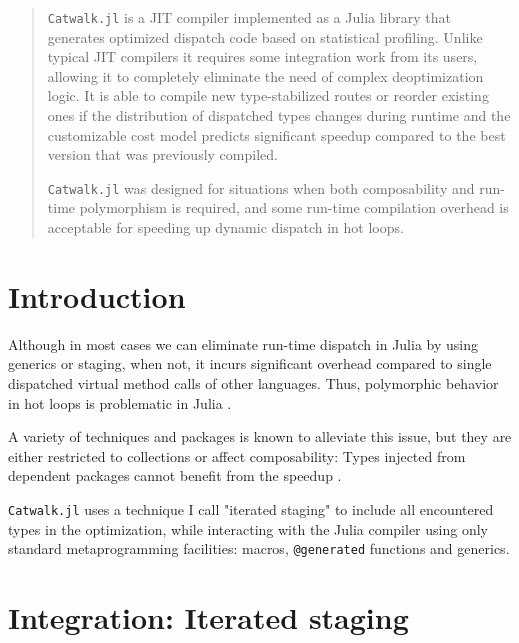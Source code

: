 \documentclass{juliacon}
\begin{document}


\maketitle

\begin{abstract}

\verb|Catwalk.jl| is a JIT compiler implemented as a Julia library that generates optimized dispatch code based on statistical profiling.
Unlike typical JIT compilers it requires some integration work from its users, allowing it to completely eliminate
the need of complex deoptimization logic. It is able to compile new type-stabilized routes or reorder existing ones if the distribution of dispatched types changes during runtime and the customizable cost model predicts significant speedup compared to the best version that was previously compiled.

\verb|Catwalk.jl| was designed for situations when both composability and run-time polymorphism is required,
and some run-time compilation overhead is acceptable for speeding up dynamic dispatch in hot loops.

\headingtable

\end{abstract}

\section{Introduction}

Although in most cases we can eliminate run-time dispatch in Julia by using generics or staging, when not, it incurs significant overhead compared to single dispatched virtual method calls of other languages. Thus, polymorphic behavior in hot loops is problematic in Julia \cite{subtypeperf}.

A variety of techniques and packages is known to alleviate this issue, but they are either restricted to collections \cite{typesortedcollections} \cite{singledispatcharrays} or affect composability: Types injected from
dependent packages cannot benefit from the speedup \cite{unionsplitting} \cite{manualdispatch}.


\verb|Catwalk.jl| uses a technique I call "iterated staging" to include all encountered types in the optimization, while interacting with the Julia compiler using only standard metaprogramming facilities: macros, \verb|@generated| functions and generics.

\section{Integration: Iterated staging}
\end{document}
